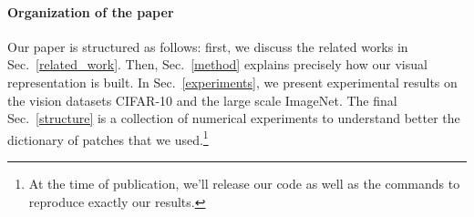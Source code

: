 \documentclass{article} %
\newcommand{\Edouard}[1]{\textcolor{blue}{#1}}
\begin{document}




\paragraph{Organization of the paper}Our paper is structured as follows: first, we discuss the related works in Sec.~\ref{related_work}. Then, Sec.~\ref{method} explains precisely how our visual representation is built. In Sec.~\ref{experiments}, we present experimental results on the vision datasets CIFAR-10 and the large scale  ImageNet. The final Sec.~\ref{structure} is a collection of numerical experiments to understand better the dictionary of patches that we used.\footnote{At the time of publication, we'll release our code  as well as the commands to reproduce exactly our results.}



\end{document}
